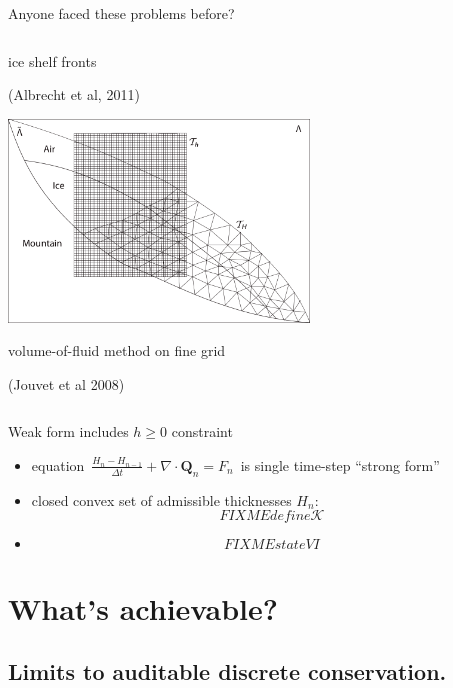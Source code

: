 \documentclass{beamer}
\newcommand\bQ{\mathbf{Q}}
\newcommand{\Div}{\nabla\cdot}
\begin{document}
\begin{frame}{Anyone faced these problems before?}
{\begin{columns}
\begin{column}{0.6\textwidth}
\small ice shelf fronts

\tiny (Albrecht et al, 2011)

\small \medskip
\includegraphics[width=0.6\textwidth,keepaspectratio=true]{jouvet-two-grids}

\small volume-of-fluid method on fine grid

\tiny (Jouvet et al 2008)
\end{column}
\end{columns}}

\end{frame}


\begin{frame}{Weak form includes $h\ge 0$ constraint}

  \begin{itemize}
  \item equation \,$\frac{H_n - H_{n-1}}{\Delta t} + \Div \bQ_n = F_n$\, is single time-step ``strong form''
  \item closed convex set of admissible thicknesses $H_n$:
    $$FIXME define \mathcal{K}$$
  \item
    $$FIXME state VI$$
  \end{itemize}
\end{frame}




\section{What's achievable?}

\subsection{Limits to auditable discrete conservation.}
\end{document}
